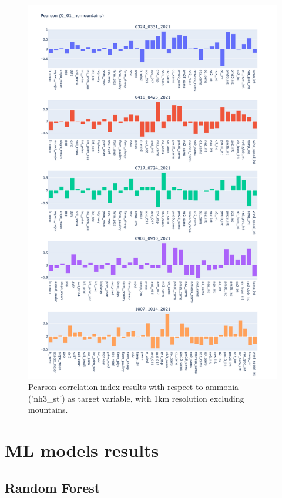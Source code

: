 \begin{figure}[H]
    \centering
    \includegraphics[scale=0.35]{images/tests/0_01_nomountainsnh3_st_pearson.png}
    \caption{Pearson correlation index results with respect to ammonia ('nh3\_st') as target variable, with 1km resolution excluding mountains.}
    \label{fig:overview}
\end{figure}

\section{ML models results}
\subsection{Random Forest}

